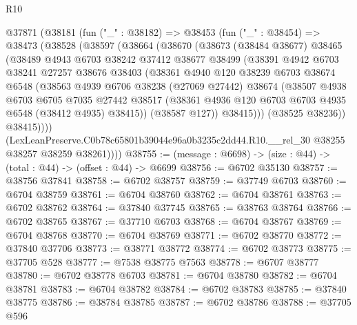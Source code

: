 \begin{lexlean}{R10}
\begin{coremodule}
  @37871
    (@38181
      (fun ("_" : @38182) =>
      @38453
        (fun ("_" : @38454) =>
        @38473
          (@38528
            (@38597
              (@38664
                (@38670
                  (@38673
                    (@38484 @38677)
                    @38465
                    (@38489
                      @4943
                      @6703
                      @38242
                      @37412
                      @38677
                      @38499
                      (@38391
                        @4942
                        @6703
                        @38241
                        @27257
                        @38676
                        @38403
                        (@38361
                          @4940
                          @120
                          @38239
                          @6703
                          @38674
                          @6548
                          (@38563
                            @4939
                            @6706
                            @38238
                            (@27069 @27442)
                            @38674
                            (@38507
                              @4938
                              @6703
                              @6705
                              @7035
                              @27442
                              @38517
                              (@38361 @4936 @120 @6703 @6703 @4935 @6548 (@38412 @4935) @38415))
                            (@38587 @127))
                          @38415)))
                    (@38525 @38236))
                  @38415))))
          (LexLeanPreserve.C0b78c65801b39044e96a0b3235c2dd44.R10.__rel_30
            @38255
            @38257
            @38259
            @38261))))
@38755 := (message : @6698) -> (size : @44) -> (total : @44) -> (offset : @44) -> @6699
@38756 := @6702 @35130
@38757 := @38756 @37841
@38758 := @6702 @38757
@38759 := @37749 @6703
@38760 := @6704 @38759
@38761 := @6704 @38760
@38762 := @6704 @38761
@38763 := @6702 @38762
@38764 := @37840 @37745
@38765 := @38763 @38764
@38766 := @6702 @38765
@38767 := @37710 @6703
@38768 := @6704 @38767
@38769 := @6704 @38768
@38770 := @6704 @38769
@38771 := @6702 @38770
@38772 := @37840 @37706
@38773 := @38771 @38772
@38774 := @6702 @38773
@38775 := @37705 @528
@38777 := @7538 @38775 @7563
@38778 := @6707 @38777
@38780 := @6702 @38778 @6703
@38781 := @6704 @38780
@38782 := @6704 @38781
@38783 := @6704 @38782
@38784 := @6702 @38783
@38785 := @37840 @38775
@38786 := @38784 @38785
@38787 := @6702 @38786
@38788 := @37705 @596

\end{coremodule}
\end{lexlean}
